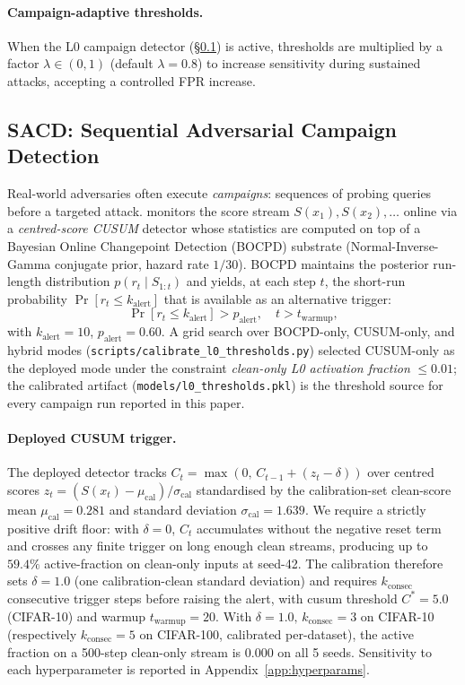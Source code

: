 \paragraph{Campaign-adaptive thresholds.}
When the L0 campaign detector (\S\ref{sec:sacd}) is active, thresholds are 
multiplied by a factor $\lambda \in (0,1)$ (default $\lambda=0.8$) to increase 
sensitivity during sustained attacks, accepting a controlled FPR increase.

\subsection{SACD: Sequential Adversarial Campaign Detection}
\label{sec:sacd}

Real-world adversaries often execute \emph{campaigns}: sequences of probing
queries before a targeted attack.
\sacd monitors the score stream $S(x_1), S(x_2), \ldots$ online via a
\emph{centred-score CUSUM} detector whose statistics are computed on top
of a Bayesian Online Changepoint Detection (BOCPD)
\cite{adams2007bayesian} substrate (Normal-Inverse-Gamma conjugate prior,
hazard rate $1/30$). BOCPD maintains the posterior run-length
distribution $p(r_t \mid S_{1:t})$ and yields, at each step $t$, the
short-run probability
$\Pr[r_t \leq k_\text{alert}]$ that is available as an alternative
trigger:
\begin{equation}
  \Pr[r_t \leq k_\text{alert}] > p_\text{alert}, \quad t > t_\text{warmup},
  \label{eq:l0_trigger}
\end{equation}
with $k_\text{alert}=10$, $p_\text{alert}=0.60$.
A grid search over BOCPD-only, CUSUM-only, and hybrid modes
(\texttt{scripts/calibrate\_l0\_thresholds.py}) selected CUSUM-only as
the deployed mode under the constraint
\textit{clean-only L0 activation fraction} $\leq 0.01$; the calibrated
artifact (\texttt{models/l0\_thresholds.pkl}) is the threshold source for
every campaign run reported in this paper.

\paragraph{Deployed CUSUM trigger.}
The deployed detector tracks
$C_t = \max(0,\, C_{t-1} + (z_t - \delta))$ over centred scores
$z_t = (S(x_t) - \mu_\text{cal}) / \sigma_\text{cal}$ standardised by the
calibration-set clean-score mean $\mu_\text{cal}=0.281$ and standard
deviation $\sigma_\text{cal}=1.639$. We require a strictly positive drift
floor: with $\delta = 0$, $C_t$ accumulates without the negative reset
term and crosses any finite trigger on long enough clean streams,
producing up to $59.4\%$ active-fraction on clean-only inputs at seed-42.
The calibration therefore sets $\delta = \mathbf{1.0}$ (one calibration-clean
standard deviation) and requires
$k_\text{consec}$ consecutive trigger steps before raising the alert,
with cusum threshold $C^* = 5.0$ (CIFAR-10) and warmup
$t_\text{warmup}=20$. With $\delta=1.0,\, k_\text{consec}=3$ on CIFAR-10
(respectively $k_\text{consec}=5$ on CIFAR-100, calibrated per-dataset),
the active fraction on a 500-step clean-only stream is $0.000$ on all 5
seeds. Sensitivity to each hyperparameter is reported in
Appendix~\ref{app:hyperparams}.

